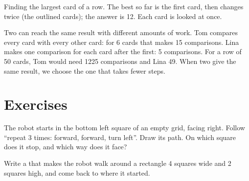 \begin{omfigure}

{\small Finding the largest card of a row. The best so far is the first
card, then changes twice (the outlined cards); the answer is 12. Each card is looked at once.}
\label{fig:g4:algorithms-repeat-and-decide:largest}
\end{omfigure}

Two  can reach the same result with different amounts of work. Tom
compares every card with every other card: for 6 cards that makes 15
comparisons. Lina makes one comparison for each card after the first: 5
comparisons. For a row of 50 cards, Tom would need \num{1225} comparisons
and Lina 49. When two  give the same result, we choose the one that
takes fewer steps.

\section{Exercises}

\begin{exercise}[$\star$]\label{exo:g4:algorithms-repeat-and-decide:1}
The robot starts in the bottom left square of an empty grid, facing right.
Follow ``repeat 3 times: forward, forward, turn left''. Draw its path. On which
square does it stop, and which way does it face?
\end{exercise}

\begin{exercise}[$\star$]\label{exo:g4:algorithms-repeat-and-decide:2}
Write a  that makes the robot walk around a rectangle 4 squares wide and
2 squares high, and come back to where it started.
\end{exercise}

